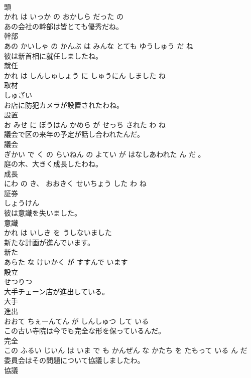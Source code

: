 \documentclass[8pt]{extreport}
\begin{document}
\begin{CJK}{UTF8}{min}
\\	頭 
\\	かれ は いっか の おかしら だった の			
\\	あの会社の幹部は皆とても優秀だね。	
\\	幹部 
\\	あの かいしゃ の かんぶ は みんな とても ゆうしゅう だ ね			
\\	彼は新首相に就任しましたね。	
\\	就任 
\\	かれ は しんしゅしょう に しゅうにん しました ね			
\\	取材	
\\	しゅざい			
\\	お店に防犯カメラが設置されたわね。	
\\	設置 
\\	お みせ に ぼうはん かめら が せっち された わ ね			
\\	議会で区の来年の予定が話し合われたんだ。	
\\	議会 
\\	ぎかい で く の らいねん の よてい が はなしあわれた ん だ 。			
\\	庭の木、大きく成長したわね。	
\\	成長 
\\	にわ の き、 おおきく せいちょう した わ ね			
\\	証券	
\\	しょうけん			
\\	彼は意識を失いました。	
\\	意識 
\\	かれ は いしき を うしないました			
\\	新たな計画が進んでいます。	
\\	新た 
\\	あらた な けいかく が すすんで います			
\\	設立	
\\	せつりつ			
\\	大手チェーン店が進出している。	
\\	大手 
\\	進出 
\\	おおて ちぇーんてん が しんしゅつ して いる			
\\	この古い寺院は今でも完全な形を保っているんだ。	
\\	完全 
\\	この ふるい じいん は いま で も かんぜん な かたち を たもって いる ん だ			
\\	委員会はその問題について協議しましたわ。	
\\	協議 

\end{CJK}
\end{document}
